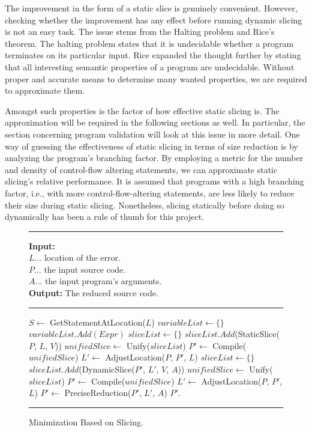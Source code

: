 The improvement in the form of a static slice is genuinely convenient.
However, checking whether the improvement has any effect before running 
dynamic slicing is not an easy task.
The issue stems from the Halting problem and Rice's theorem.
The halting problem states that it is undecidable whether a program 
terminates on its particular input.
Rice expanded the thought further by stating that all interesting semantic 
properties of a program are undecidable.
Without proper and accurate means to determine many wanted properties, 
we are required to approximate them.

Amongst such properties is the factor of how effective static slicing is.
The approximation will be required in the following sections as well.
In particular, the section concerning program validation will look at this 
issue in more detail.
One way of guessing the effectiveness of static slicing in terms of size 
reduction is by analyzing the program's branching factor.
By employing a metric for the number and density of control-flow altering 
statements, we can approximate static slicing's relative performance.
It is assumed that programs with a high branching factor, i.e., with more 
control-flow-altering statements, are less likely to reduce their size 
during static slicing.
Nonetheless, slicing statically before doing so dynamically has been 
a rule of thumb for this project.

\begin{figure}[h]
	\hrule height.8pt depth0pt \kern2pt
	\textbf{Input:} \\
	\hspace*{\algorithmicindent} $L \ldots$ location of the error. \\
	\hspace*{\algorithmicindent} $P \ldots$ the input source code. \\
	\hspace*{\algorithmicindent} $A \ldots$ the input program's arguments. \\
	\textbf{Output:} The reduced source code. 
	\hrule height.8pt depth0pt \kern2pt
	\begin{algorithmic}[1]
		\State $S \leftarrow$ GetStatementAtLocation($L$)
		\State $variableList \leftarrow \{\}$
				\State $variableList.Add(Expr)$
			\EndIf
		\EndFor
		\State $sliceList \leftarrow \{\}$
			\State $sliceList.Add$(StaticSlice($P$, $L$, $V$))
		\EndFor
		\State $unifiedSlice \leftarrow$ Unify($sliceList$)
		\State $P' \leftarrow$ Compile($unifiedSlice$)
		\State $L' \leftarrow$ AdjustLocation($P$, $P'$, $L$)
		\State $sliceList \leftarrow \{\}$
			\State $sliceList.Add$(DynamicSlice($P'$, $L'$, $V$, $A$))
		\EndFor
		\State $unifiedSlice \leftarrow$ Unify($sliceList$)
		\State $P' \leftarrow$ Compile($unifiedSlice$)
		\State $L' \leftarrow$ AdjustLocation($P$, $P'$, $L$)
		\State $P' \leftarrow$ PreciseReduction($P'$, $L'$, $A$)
		\State \Return $P'$.
	\end{algorithmic} 
	\hrule height.8pt depth0pt \kern2pt
	\caption{Minimization Based on Slicing.} 
	\label{alg:slicing}
\end{figure}

